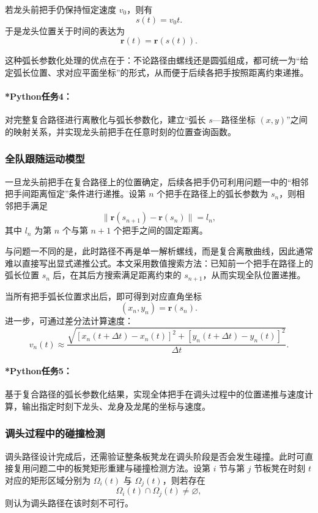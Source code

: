 \documentclass[12pt,a4paper]{ctexart}
\begin{document}
若龙头前把手仍保持恒定速度 $v_0$，则有
\begin{equation}
s(t)=v_0 t.
\end{equation}
于是龙头位置关于时间的表达为
\begin{equation}
\bm{r}(t)=\bm{r}(s(t)).
\end{equation}

这种弧长参数化处理的优点在于：不论路径由螺线还是圆弧组成，都可统一为“给定弧长位置、求对应平面坐标”的形式，从而便于后续各把手按照距离约束递推。

\paragraph{*Python任务4：}
对完整复合路径进行离散化与弧长参数化，建立“弧长 $s$—路径坐标 $(x,y)$”之间的映射关系，并实现龙头前把手在任意时刻的位置查询函数。

\subsubsection{全队跟随运动模型}
一旦龙头前把手在复合路径上的位置确定，后续各把手仍可利用问题一中的“相邻把手间距离恒定”条件进行递推。设第 $n$ 个把手在路径上的弧长参数为 $s_n$，则相邻把手满足
\begin{equation}
\|\bm{r}(s_{n+1})-\bm{r}(s_n)\|=l_n,
\end{equation}
其中 $l_n$ 为第 $n$ 个与第 $n+1$ 个把手之间的固定距离。

与问题一不同的是，此时路径不再是单一解析螺线，而是复合离散曲线，因此通常难以直接写出显式递推公式。本文采用数值搜索方法：已知前一个把手在路径上的弧长位置 $s_n$ 后，在其后方搜索满足距离约束的 $s_{n+1}$，从而实现全队位置递推。

当所有把手弧长位置求出后，即可得到对应直角坐标
\begin{equation}
(x_n,y_n)=\bm{r}(s_n).
\end{equation}
进一步，可通过差分法计算速度：
\begin{equation}
v_n(t)\approx
\frac{\sqrt{[x_n(t+\Delta t)-x_n(t)]^2+[y_n(t+\Delta t)-y_n(t)]^2}}{\Delta t}.
\end{equation}

\paragraph{*Python任务5：}
基于复合路径的弧长参数化结果，实现全体把手在调头过程中的位置递推与速度计算，输出指定时刻下龙头、龙身及龙尾的坐标与速度。

\subsubsection{调头过程中的碰撞检测}
调头路径设计完成后，还需验证整条板凳龙在调头阶段是否会发生碰撞。此时可直接复用问题二中的板凳矩形重建与碰撞检测方法。设第 $i$ 节与第 $j$ 节板凳在时刻 $t$ 对应的矩形区域分别为 $\Omega_i(t)$ 与 $\Omega_j(t)$，则若存在
\begin{equation}
\Omega_i(t)\cap\Omega_j(t)\neq\varnothing,
\end{equation}
则认为调头路径在该时刻不可行。
\end{document}
